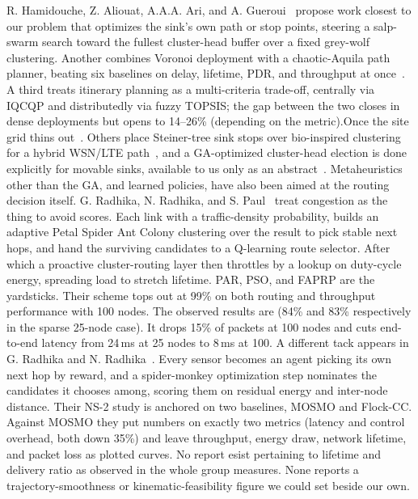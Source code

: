 \documentclass[runningheads]{llncs}
\begin{document}
R. Hamidouche, Z. Aliouat, A.A.A. Ari,
and A. Gueroui~\cite{hamidouche2021mssa} propose work closest to our
problem that optimizes the sink's own path or stop points, steering a
salp-swarm search toward the fullest cluster-head buffer over a fixed
grey-wolf clustering. Another combines Voronoi deployment
with a chaotic-Aquila path planner, beating six baselines on delay,
lifetime, PDR, and throughput at once~\cite{sangeetha2024exaqmspp}. A third
treats itinerary planning as a multi-criteria trade-off, centrally via
IQCQP and distributedly via fuzzy TOPSIS; the gap between the two closes in
dense deployments but opens to 14--26\% (depending on the metric).Once the
site grid thins out~\cite{khalily2023itinerary}. Others place Steiner-tree
sink stops over bio-inspired clustering for a hybrid WSN/LTE
path~\cite{mohan2024mfoms}, and a GA-optimized cluster-head election is done 
explicitly for movable sinks, available to us only as an
abstract~\cite{nandan2021optigachs}. Metaheuristics other than the GA, and
learned policies, have also been aimed at the routing decision itself.
G. Radhika, N. Radhika, and S. Paul~\cite{radhikag2024cooperative} treat congestion as the thing
to avoid scores. Each link with a traffic-density probability, builds an
adaptive Petal Spider Ant Colony clustering over the result to pick stable
next hops, and hand the surviving candidates to a Q-learning route
selector. After which a proactive cluster-routing layer then throttles by a lookup on
duty-cycle energy, spreading load to stretch lifetime. PAR, PSO, and FAPRP
are the yardsticks. Their scheme tops out at 99\% on both routing and
throughput performance with 100 nodes. The observed results are (84\% and 83\% respectively in the
sparse 25-node case). It drops 15\% of packets at 100 nodes and cuts
end-to-end latency from 24\,ms at 25 nodes to 8\,ms at 100. A different
tack appears in G. Radhika and N. Radhika~\cite{radhikag2023smorl}. Every sensor
becomes an agent picking its own next hop by reward, and a spider-monkey
optimization step nominates the candidates it chooses among, scoring them
on residual energy and inter-node distance. Their NS-2 study is anchored on
two baselines, MOSMO and Flock-CC. Against MOSMO they put numbers on
exactly two metrics (latency and control overhead, both down 35\%) and
leave throughput, energy draw, network lifetime, and packet loss as plotted
curves. No report esist pertaining to lifetime and delivery ratio as observed
in the whole group measures. None reports a trajectory-smoothness or
kinematic-feasibility figure we could set beside our own.
\end{document}
